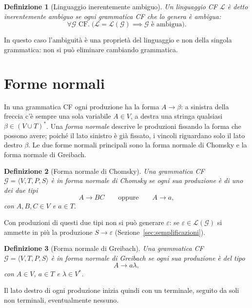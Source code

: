 \documentclass[a4paper, 11pt, oneside]{book}
\theoremstyle{formale}
\newtheorem*{definition}{Definizione}
\begin{document}
    \begin{definition}[Linguaggio inerentemente ambiguo]
        Un linguaggio CF $\mathcal{L}$ \`e detto \emph{inerentemente ambiguo} se ogni
        grammatica CF che lo genera \`e ambigua:
        \begin{equation*}
            \forall \mathcal{G} \text{ CF}.\;
            \bigl(\mathcal{L} = \mathcal{L}(\mathcal{G}) \implies
            \mathcal{G} \text{ \`e ambigua}\bigr).
        \end{equation*}
    \end{definition}
    In questo caso l'ambiguit\`a \`e una propriet\`a del linguaggio e non della singola
    grammatica: non si pu\`o eliminare cambiando grammatica.

    \section{Forme normali}
    \label{sec:forme-normali}
    In una grammatica CF ogni produzione ha la forma $A \to \beta$: a sinistra della
    freccia c'\`e sempre una sola variabile $A \in V$, a destra una stringa qualsiasi
    $\beta \in (V \cup T)^*$. Una \emph{forma normale} descrive le produzioni fissando la
    forma che possono avere; poich\'e il lato sinistro \`e gi\`a fissato, i vincoli
    riguardano solo il lato destro $\beta$. Le due forme normali principali sono la forma
    normale di Chomsky e la forma normale di Greibach.

    \begin{definition}[Forma normale di Chomsky]
        Una grammatica CF $\mathcal{G} = \langle V, T, P, S \rangle$ \`e in \emph{forma
        normale di Chomsky} se ogni sua produzione \`e di uno dei due tipi
        \begin{equation*}
            A \to BC \qquad \text{oppure} \qquad A \to a,
        \end{equation*}
        con $A, B, C \in V$ e $a \in T$.
    \end{definition}
    Con produzioni di questi due tipi non si pu\`o generare $\varepsilon$: se
    $\varepsilon \in \mathcal{L}(\mathcal{G})$ si ammette in pi\`u la produzione
    $S \to \varepsilon$ (Sezione~\ref{sec:semplificazioni}).

    \begin{definition}[Forma normale di Greibach]
        Una grammatica CF $\mathcal{G} = \langle V, T, P, S \rangle$ \`e in \emph{forma
        normale di Greibach} se ogni sua produzione \`e del tipo
        \begin{equation*}
            A \to a\lambda,
        \end{equation*}
        con $A \in V$, $a \in T$ e $\lambda \in V^*$.
    \end{definition}
    Il lato destro di ogni produzione inizia quindi con un terminale, seguito da soli
    non terminali, eventualmente nessuno.
\end{document}
